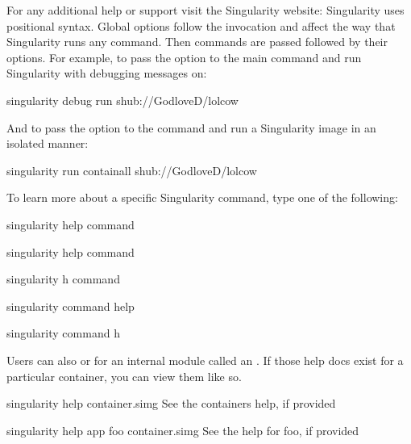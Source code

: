 \documentclass[letterpaper,10pt,english]{sphinxmanual}
\begin{document}
For any additional help or support visit the Singularity website:
Singularity uses positional syntax. Global options follow the 
invocation and affect the way that Singularity runs any command. Then
commands are passed followed by their options.
For example, to pass the  option to the main  command and run
Singularity with debugging messages on:

%
\begin{sphinxVerbatim}[commandchars=\\\{\}]
\PYGZdl{} singularity \PYGZhy{}\PYGZhy{}debug run shub://GodloveD/lolcow
\end{sphinxVerbatim}

And to pass the  option to the  command and run a Singularity image in an
isolated manner:

%
\begin{sphinxVerbatim}[commandchars=\\\{\}]
\PYGZdl{} singularity run \PYGZhy{}\PYGZhy{}containall shub://GodloveD/lolcow
\end{sphinxVerbatim}

To learn more about a specific Singularity command, type one of the
following:

%
\begin{sphinxVerbatim}[commandchars=\\\{\}]
\PYGZdl{} singularity help \PYGZlt{}command\PYGZgt{}

\PYGZdl{} singularity \PYGZhy{}\PYGZhy{}help \PYGZlt{}command\PYGZgt{}

\PYGZdl{} singularity \PYGZhy{}h \PYGZlt{}command\PYGZgt{}

\PYGZdl{} singularity \PYGZlt{}command\PYGZgt{} \PYGZhy{}\PYGZhy{}help

\PYGZdl{} singularity \PYGZlt{}command\PYGZgt{} \PYGZhy{}h
\end{sphinxVerbatim}

Users can also {\hyperref[\detokenize{container_recipes:help}]{}} or for an internal module called an . If those help
docs exist for a particular container, you can view them like so.

%
\begin{sphinxVerbatim}[commandchars=\\\{\}]
\PYGZdl{} singularity help container.simg            \PYGZsh{} See the container\PYGZsq{}s help, if provided

\PYGZdl{} singularity help \PYGZhy{}\PYGZhy{}app foo container.simg  \PYGZsh{} See the help for foo, if provided
\end{sphinxVerbatim}
\end{document}
